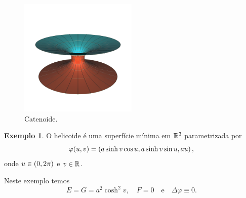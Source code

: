 \documentclass[12pt,a4paper]{beamer}
\theoremstyle{definition}
\newtheorem{exemplo}{Exemplo}
\begin{document}
\begin{frame}
	
	\begin{figure}
		\centering
		\includegraphics[width=0.5\textwidth]{images/catenoid}
		\caption{Catenoide.}
	\end{figure}

\end{frame}

\begin{frame}

		\begin{exemplo}
		O \alert{helicoide} é uma superfície mínima em $\mathbb R^3$ parametrizada por
		\begin{equation*}
		\varphi(u,v) = \left( a \sinh v \cos u, a \sinh v \sin u, au \right),
		\end{equation*}
		onde $u \in \left( 0, 2\pi \right)$ e $v \in \mathbb R$.
	\end{exemplo}
	Neste exemplo temos
	\begin{equation*}
	E = G = a^2 \cosh^2 v, \quad F = 0 \quad \text{e} \quad \Delta \varphi \equiv 0.
	\end{equation*}
	
\end{frame}
\end{document}
